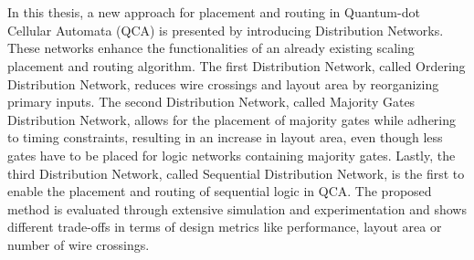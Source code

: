 \chapter{\abstractname}

In this thesis, a new approach for placement and routing in Quantum-dot Cellular Automata (QCA) is presented by introducing Distribution Networks. These networks enhance the functionalities of an already existing scaling placement and routing algorithm. The first Distribution Network, called Ordering Distribution Network, reduces wire crossings and layout area by reorganizing primary inputs. The second Distribution Network, called Majority Gates Distribution Network, allows for the placement of majority gates while adhering to timing constraints, resulting in an increase in layout area, even though less gates have to be placed for logic networks containing majority gates. Lastly, the third Distribution Network, called Sequential Distribution Network, is the first to enable the placement and routing of sequential logic in QCA. The proposed method is evaluated through extensive simulation and experimentation and shows different trade-offs in terms of design metrics like performance, layout area or number of wire crossings.




